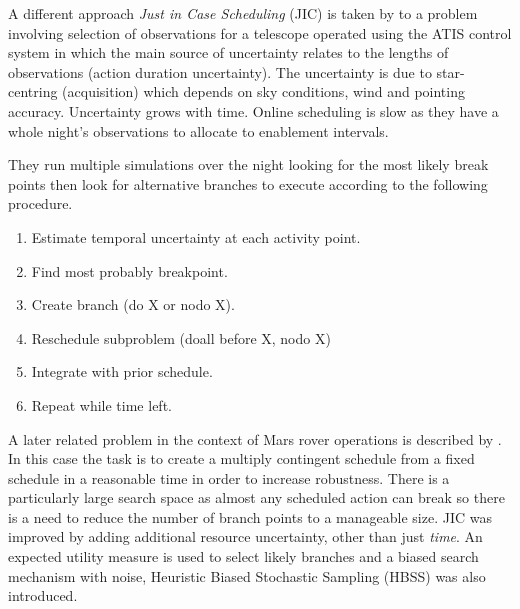 
A different approach \emph{Just in Case Scheduling} (JIC) is taken by \citet{bresina94jic, drummond94jic} to a problem involving selection of observations for a telescope operated using the ATIS control system in which the main source of uncertainty relates to the lengths of observations (action duration uncertainty). The uncertainty is due to star-centring (acquisition) which depends on sky conditions, wind and pointing accuracy. Uncertainty grows with time. Online scheduling is slow as they have a whole night's observations to allocate to enablement intervals. 

They run multiple simulations over the night looking for the most likely break points then look for alternative branches to execute according to the following procedure.

\begin{enumerate}
\item Estimate temporal uncertainty at each activity point.
\item Find most probably breakpoint.
\item Create branch (do X or nodo X).
\item Reschedule subproblem (doall before X, nodo X)
\item Integrate with prior schedule.
\item Repeat while time left.
\end{enumerate}



 A later related problem in the context of Mars rover operations is described by \citet{bresina99increased}. In this case the task is to create a multiply contingent schedule from a fixed schedule in a reasonable time in order to increase robustness. There is a particularly large search space as almost any scheduled action can break so there is a need to reduce the number of branch points to a manageable size. JIC was improved by adding additional resource uncertainty, other than just \emph{time}. An expected utility measure is used to select likely branches and a biased search mechanism with noise, Heuristic Biased Stochastic Sampling (HBSS) \citep{bresina96hbss} was also introduced.
 
%
%

